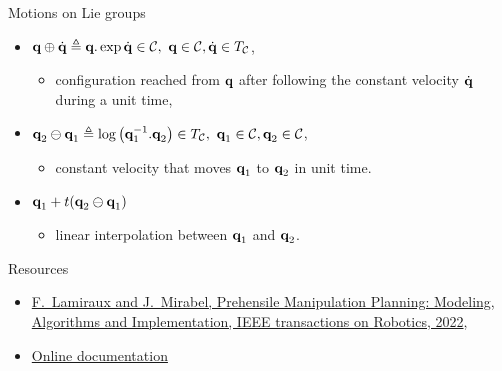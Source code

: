 \begin{frame} {Motions on Lie groups}
  \begin{itemize}
  \item $\conf\oplus\dconf\triangleq\conf.\exp\dconf\in\CS,\ \conf\in\CS, \dconf\in\TCS$,
    \begin{itemize}
    \item configuration reached from $\textbf{q}$ after following the constant velocity $\dot{\mathbf{q}}$ during a unit time,
    \end{itemize}
  \item $\conf_2\ominus\conf_1\triangleq\log\left(\conf_1^{-1}.\conf_2\right)\in\TCS,\ \conf_1\in\CS, \conf_2\in\CS$,
    \begin{itemize}
    \item constant velocity that moves $\textbf{q}_1$ to $\textbf{q}_2$ in unit time.
      \end{itemize}
  \item $\textbf{q}_1 + t (\textbf{q}_2\ominus\textbf{q}_1)$
    \begin{itemize}
    \item linear interpolation between $\textbf{q}_1$ and $\textbf{q}_2$.
    \end{itemize}
  \end{itemize}
\end{frame}

\begin{frame} {Resources}
  \begin{itemize}
  \item \href{https://laas.hal.science/LAAS-GEPETTO/hal-02995125v2}{F.~Lamiraux and J.~Mirabel, Prehensile Manipulation Planning: Modeling, Algorithms and Implementation, IEEE transactions on Robotics, 2022},
  \item \href{https://humanoid-path-planner.github.io/hpp-doc}{Online documentation}
  \end{itemize}
\end{frame}

